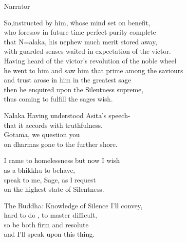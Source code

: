 Narrator

\begin{tabbing}
So,instructed by him, \hspace{1cm} \= whose mind set on benefit,\\
who foresaw in future time \> perfect purity complete\\
that N\a=alaka, his nephew \> much merit stored away,\\
with guarded senses waited \> in expectation of the victor.\\
Having heard of the victor's \> revolution of the noble wheel\\
he went to him and saw him \> that prime among the saviours\\
and trust arose in him \> in the greatest sage\\
then he enquired upon \> the Silentness supreme,\\
thus coming to fulfill \> the sages wish.\\
\end{tabbing}


\begin{MyDescription}{N\=alaka}
Having understood Asita's speech-\\
that it accords with truthfulness,\\
Gotama, we question you\\
on dharmas gone to the further shore.
\end{MyDescription} 

\begin{MyDescription}{}
I came to homelessness but now I wish\\
as a bhikkhu to behave,\\
speak to me, Sage, as l request\\
on the highest state of Silentness.
\end{MyDescription} 

\begin{MyDescription}{The Buddha:}
Knowledge of Silence I'll convey,\\
hard to do , to master difficult,\\
so be both firm and resolute\\
and I'll speak upon this thing.
\end{MyDescription} 

